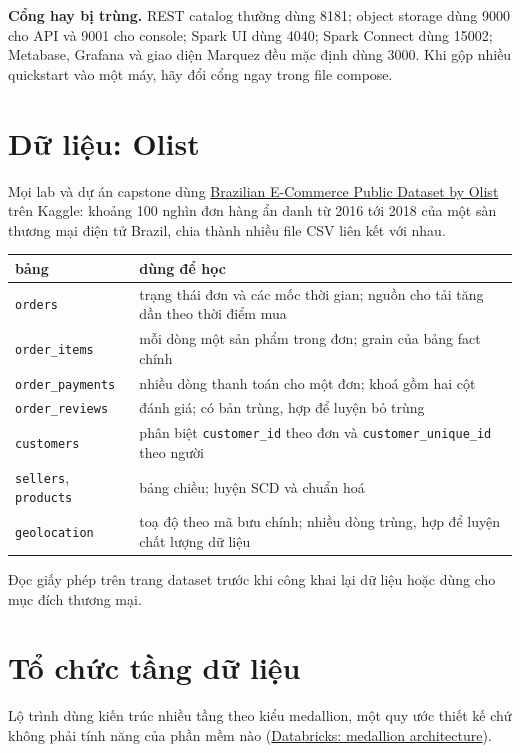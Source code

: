 \documentclass[11pt,a4paper,oneside]{report}
\newcommand{\thd}[1]{\textbf{\sffamily\small #1}}
\newcommand{\code}[1]{\texttt{#1}}
\begin{document}
\begin{luuy}
\textbf{Cổng hay bị trùng.} REST catalog thường dùng 8181; object storage dùng 9000 cho API và 9001 cho console; Spark UI dùng 4040; Spark Connect dùng 15002; Metabase, Grafana và giao diện Marquez đều mặc định dùng 3000. Khi gộp nhiều quickstart vào một máy, hãy đổi cổng ngay trong file compose.
\end{luuy}

\section{Dữ liệu: Olist}
Mọi lab và dự án capstone dùng \href{https://www.kaggle.com/datasets/olistbr/brazilian-ecommerce}{Brazilian E-Commerce Public Dataset by Olist} trên Kaggle: khoảng 100 nghìn đơn hàng ẩn danh từ 2016 tới 2018 của một sàn thương mại điện tử Brazil, chia thành nhiều file CSV liên kết với nhau.

\begin{xltabular}{\textwidth}{@{}P{4.6cm} L@{}}
\toprule
\thd{bảng} & \thd{dùng để học} \\
\midrule
\endhead
\bottomrule
\endfoot
\code{orders} & trạng thái đơn và các mốc thời gian; nguồn cho tải tăng dần theo thời điểm mua \\
\code{order\_items} & mỗi dòng một sản phẩm trong đơn; grain của bảng fact chính \\
\code{order\_payments} & nhiều dòng thanh toán cho một đơn; khoá gồm hai cột \\
\code{order\_reviews} & đánh giá; có bản trùng, hợp để luyện bỏ trùng \\
\code{customers} & phân biệt \code{customer\_id} theo đơn và \code{customer\_unique\_id} theo người \\
\code{sellers}, \code{products} & bảng chiều; luyện SCD và chuẩn hoá \\
\code{geolocation} & toạ độ theo mã bưu chính; nhiều dòng trùng, hợp để luyện chất lượng dữ liệu \\
\end{xltabular}
Đọc giấy phép trên trang dataset trước khi công khai lại dữ liệu hoặc dùng cho mục đích thương mại.

\section{Tổ chức tầng dữ liệu}
Lộ trình dùng kiến trúc nhiều tầng theo kiểu medallion, một quy ước thiết kế chứ không phải tính năng của phần mềm nào (\href{https://docs.databricks.com/aws/en/lakehouse/medallion}{Databricks: medallion architecture}).
\end{document}
